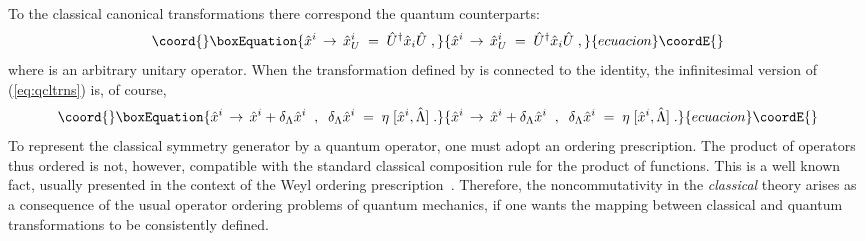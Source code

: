 \documentclass[a4paper,12pt]{article}
\begin{document}
To the classical canonical transformations there correspond the
quantum counterparts:
\begin{equation}\coord{}\boxEquation{ 
 \label{eq:qcltrns}
{\hat x}^i \,\to\, {\hat x}^i_U \;=\; {\hat U}^\dagger {\hat x}_i
\hat U \;,
}{ 
 {\hat x}^i \,\to\, {\hat x}^i_U \;=\; {\hat U}^\dagger {\hat x}_i
\hat U \;,
}{ecuacion}\coordE{}\end{equation}
where \coordHE{} is an arbitrary unitary operator. When the
transformation defined by \coordHE{} is connected to the identity,
the
infinitesimal version of (\ref{eq:qcltrns}) is, of course,
\begin{equation}\coord{}\boxEquation{
  \label{eq:qcltrns1}
{\hat x}^i \,\to\, {\hat x}^i + \delta_\Lambda {\hat x}^i \;\;,\;\;
\delta_\Lambda{\hat x}^i 
\;=\; \eta \; [ {\hat x}^i, {\hat \Lambda}] \;.
}{
  {\hat x}^i \,\to\, {\hat x}^i + \delta_\Lambda {\hat x}^i \;\;,\;\;
\delta_\Lambda{\hat x}^i 
\;=\; \eta \; [ {\hat x}^i, {\hat \Lambda}] \;.
}{ecuacion}\coordE{}\end{equation}
To represent the classical symmetry generator by a quantum
operator,
one must adopt an ordering prescription. The product of operators
thus
ordered is not, however, compatible with the standard classical
composition rule for the product of functions. This is a well known
fact, usually presented in the context of the Weyl ordering
prescription~\cite{QG}.  Therefore, the noncommutativity in the
{\em
  classical\/} theory arises as a consequence of the usual operator
ordering problems of quantum mechanics, if one wants the mapping
between classical and quantum transformations to be consistently
defined.
\end{document}
